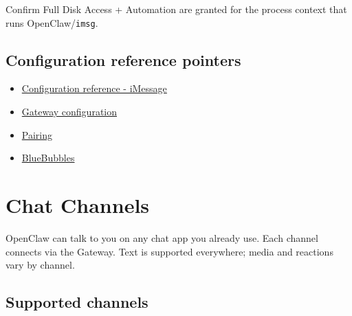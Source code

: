 Confirm Full Disk Access + Automation are granted for the process context that runs OpenClaw/\texttt{imsg}.


\subsection{Configuration reference pointers}


\begin{itemize}
  \item \href{/gateway/configuration-reference\#imessage}{Configuration reference - iMessage}
  \item \href{/gateway/configuration}{Gateway configuration}
  \item \href{/channels/pairing}{Pairing}
  \item \href{/channels/bluebubbles}{BlueBubbles}
\end{itemize}



\clearpage

\section{Chat Channels}


OpenClaw can talk to you on any chat app you already use. Each channel connects via the Gateway.
Text is supported everywhere; media and reactions vary by channel.

\subsection{Supported channels}


